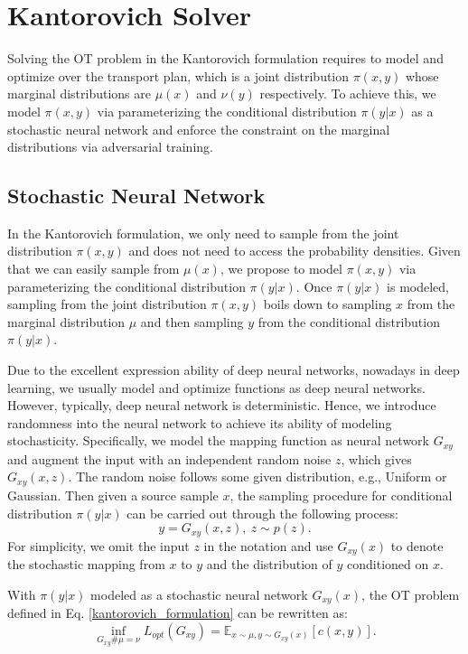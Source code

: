 \documentclass[runningheads]{llncs}
\begin{document}
\section{Kantorovich Solver}

Solving the OT problem in the Kantorovich formulation requires to model and optimize over the transport plan, which is a joint distribution $\pi(x, y)$ whose marginal distributions are $\mu(x)$ and $\nu(y)$ respectively. To achieve this, we model $\pi(x,y)$ via parameterizing the conditional distribution $\pi(y|x)$ as a stochastic neural network and enforce the constraint on the marginal distributions via adversarial training. 

\subsection{Stochastic Neural Network}

In the Kantorovich formulation, we only need to sample from the joint distribution $\pi(x,y)$ and does not need to access the probability densities. Given that we can easily sample from $\mu(x)$, we propose to model $\pi(x,y)$ via parameterizing the conditional distribution $\pi(y|x)$. Once $\pi(y|x)$ is modeled, sampling from the joint distribution $\pi(x,y)$ boils down to sampling $x$ from the marginal distribution $\mu$ and then sampling $y$ from the conditional distribution $\pi(y|x)$. 

Due to the excellent expression ability of deep neural networks, nowadays in deep learning, we usually model and optimize functions as deep neural networks. However, typically, deep neural network is deterministic. Hence, we introduce randomness into the neural network to achieve its ability of modeling stochasticity. Specifically, we model the mapping function as neural network $G_{xy}$ and augment the input with an independent random noise $z$, which gives $G_{xy}(x, z)$. The random noise follows some given distribution, e.g., Uniform or Gaussian. Then given a source sample $x$, the sampling procedure for conditional distribution $\pi(y|x)$ can be carried out through the following process:
\begin{equation}
y = G_{xy}(x, z), ~ z \sim p(z).
\end{equation}
For simplicity, we omit the input $z$ in the notation and use $G_{xy}(x)$ to denote the stochastic mapping from $x$ to $y$ and the distribution of $y$ conditioned on $x$. 

With $\pi(y|x)$ modeled as a stochastic neural network $G_{xy}(x)$, the OT problem defined in Eq. \eqref{kantorovich_formulation} can be rewritten as: 
\begin{equation}
\label{reformulate_hardconstraint}
\inf_{G_{xy}\#\mu = \nu} L_{opt}(G_{xy}) = \mathbb{E}_{x \sim \mu, y \sim G_{xy}(x)} [c(x,y)].
\end{equation}
\end{document}
